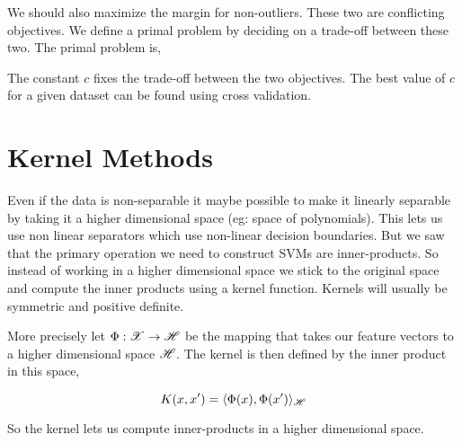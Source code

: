 \documentclass[a4paper,english,12pt]{article}
\begin{document}
We should also maximize the margin for non-outliers. These two are conflicting objectives. We define a primal problem by deciding on a trade-off between these two. The primal problem is,



The constant $c$ fixes the trade-off between the two objectives. The best value of $c$ for a given dataset can be found using cross validation.


\section{Kernel Methods}

Even if the data is non-separable it maybe possible to make it linearly separable by taking it a higher dimensional space (eg: space of polynomials). This lets us use non linear separators which use non-linear decision boundaries. But we saw that the primary operation we need to construct SVMs are inner-products. So instead of working in a higher dimensional space we stick to the original space and compute the inner products using a kernel function. Kernels will usually be symmetric and positive definite.

More precisely let $\Phi : \mathscr{X} \to \mathscr{H}$ be the mapping that takes our feature vectors to a higher dimensional space  $\mathscr{H}$. The kernel is then defined by the inner product in this space,

$$K(x, x^\prime) = \langle \Phi(x), \Phi(x^\prime) \rangle_{\mathscr{H}} $$

So the kernel lets us compute inner-products in a higher dimensional space.
\end{document}
